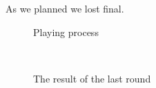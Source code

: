 As we planned we lost final.
\begin{figure}[H]
	\begin{minipage}[h]{0.47\linewidth}
		\caption{Playing process} 
	\end{minipage}
	\hfill
	\begin{minipage}[h]{0.47\linewidth}
		\caption{The result of the last round}
	\end{minipage}
\end{figure}

